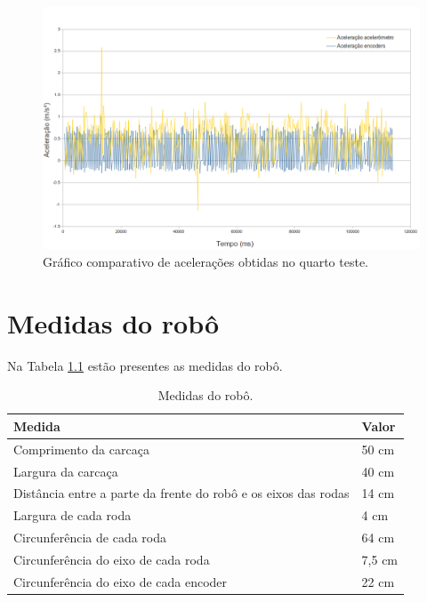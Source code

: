 \begin{figure}[H]
	\centering
	\includegraphics[width=1\textwidth]{./figuras/testes/teste4/grafico_acel.png}
	\caption{Gráfico comparativo de acelerações obtidas no quarto teste.}
	\label{fig:teste4_acel_grafico}
\end{figure}


\chapter{Medidas do robô}

Na Tabela \ref{tab:medidas_robo} estão presentes as medidas do robô.

\begin{table}[h]
  \caption{Medidas do robô.}
  \centering
  \begin{tabular}{l|l}
    \toprule
    \textbf{Medida} & \textbf{Valor} \\
    \midrule
    Comprimento da carcaça & 50 cm \\ \hline
    Largura da carcaça & 40 cm \\ \hline
    Distância entre a parte da frente do robô e os eixos das rodas & 14 cm \\ \hline
    Largura de cada roda & 4 cm \\ \hline
    Circunferência de cada roda & 64 cm \\ \hline
    Circunferência do eixo de cada roda & 7,5 cm \\ \hline
    Circunferência do eixo de cada encoder & 22 cm \\ 
    \bottomrule
  \end{tabular}
  \label{tab:medidas_robo}
\end{table}

%


